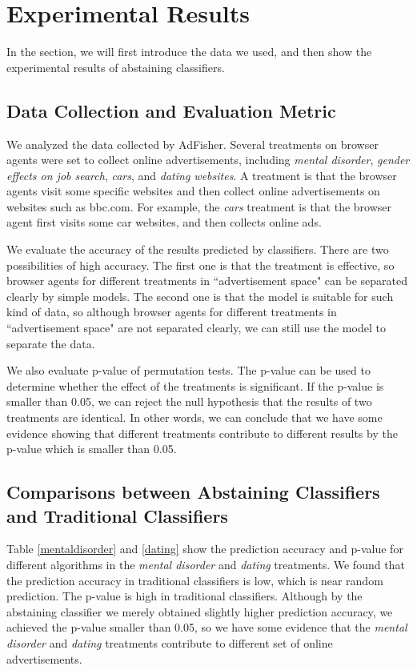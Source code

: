 \documentclass[12pt, journal]{IEEEtran}
\begin{document}
\section{Experimental Results}
In the section, we will first introduce the data we used, and then show the experimental results of abstaining classifiers.
\subsection{Data Collection and Evaluation Metric}
We analyzed the data collected by AdFisher. 
Several treatments on browser agents were set to collect online advertisements, including \textit{mental disorder}, \textit{gender effects on job search}, \textit{cars}, and \textit{dating websites}.
A treatment is that the browser agents visit some specific websites and then collect online advertisements on websites such as bbc.com.
For example, the  \textit{cars} treatment is that the browser agent first visits some car websites, and then collects online ads.

We evaluate the accuracy of the results predicted by classifiers. 
There are two possibilities of high accuracy. The first one is that the treatment is effective, so browser agents for different treatments in ``advertisement space" can be separated clearly by simple models. The second one is that the model is suitable for such kind of data, so although browser agents for different treatments in ``advertisement space" are not separated clearly, we can still use the model to separate the data.

We also evaluate p-value of permutation tests.
The p-value can be used to determine whether the effect of the treatments is significant.
If the p-value is smaller than 0.05, we can reject the null hypothesis that the results of two treatments are identical.
In other words, we can conclude that we have some evidence showing that different treatments contribute to different results by the p-value which is smaller than 0.05. 


\subsection{Comparisons between Abstaining Classifiers and Traditional Classifiers}
Table \ref{mentaldisorder} and \ref{dating} show the prediction accuracy and p-value for different algorithms in the \textit{mental disorder} and \textit{dating} treatments.
We found that the prediction accuracy in traditional classifiers is low, which is near random prediction. The p-value is high in traditional classifiers. 
Although by the abstaining classifier we merely obtained slightly higher prediction accuracy, we achieved the p-value smaller than 0.05, so we have some evidence that the \textit{mental disorder} and \textit{dating} treatments contribute to different set of online advertisements.
\end{document}
